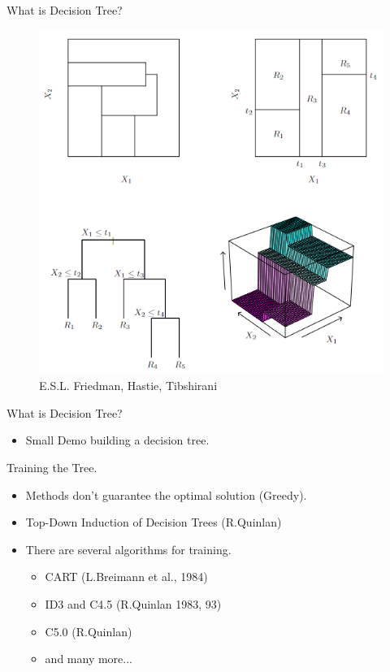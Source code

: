 \documentclass[xcolor={svgnames},
               hyperref={colorlinks,citecolor=DeepPink4,linkcolor=FireBrick,urlcolor=Maroon}]
               {beamer}
\begin{document}
  \begin{frame}{What is Decision Tree?}
            \begin{figure}
              \vspace*{\fill}
              \begin{center}
            \includegraphics[width=.55\textwidth]{ESLDecisionTreeExample.png}
          \caption{E.S.L. Friedman, Hastie, Tibshirani}
              \end{center}
              \vspace*{\fill}
            \end{figure}
  \end{frame}


  \begin{frame}{What is Decision Tree?}
  \begin{itemize}
    \item Small Demo building a decision tree. 
  \end{itemize}
  \end{frame}





  
  \begin{frame}{Training the Tree.}
    \begin{itemize}
    \item Methods don't guarantee the optimal solution (Greedy). 
    \vfill
    \item Top-Down Induction of Decision Trees (R.Quinlan)
    \vfill
    \item There are several algorithms for training.
      \begin{itemize}
        \item CART (L.Breimann et al., 1984)
        \item ID3 and C4.5 (R.Quinlan 1983, 93)
        \item C5.0 (R.Quinlan)
        \item and many more...
      \end{itemize}
    \end{itemize}

  \end{frame}
\end{document}
